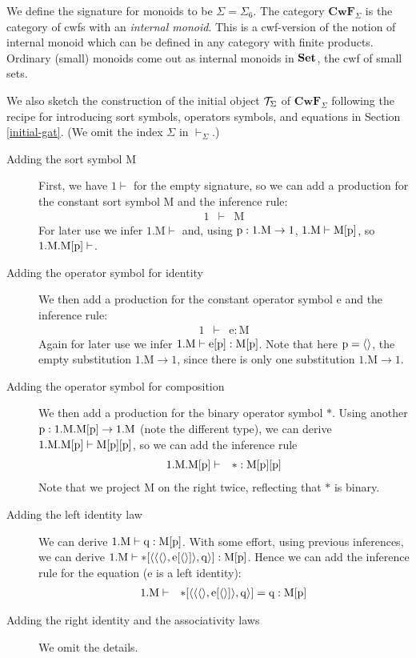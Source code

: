 \documentclass{lmcs}
\def\Cwf{\mathbf{CwF}}
\def\Mon{\mathrm{M}}
\def\idmon{\mathrm{e}}
\def\comp{\mathrm{*}}
\begin{document}
We define the signature for monoids to be $\Sigma = \Sigma_6$. The category $\Cwf_\Sigma$ is the category of cwfs with an {\em internal monoid}. This is a cwf-version of the notion of internal monoid which can be defined in any category with finite products. Ordinary (small) monoids come out as internal monoids in ${\bf Set}$, the cwf of small sets.


We also sketch the construction of the initial object ${\mathcal T}_\Sigma$ of $\Cwf_\Sigma$ following the recipe for introducing sort symbols, operators symbols, and equations in Section \ref{initial-gat}. (We omit the index $\Sigma$ in $\vdash_\Sigma$.)
\begin{description}
\item[Adding the sort symbol $\Mon$]
First, we have $1 \vdash$ for the empty signature, so we can
add a production for the constant sort symbol $\Mon$ and the inference rule:
\begin{eqnarray*}
1 &\vdash& \Mon
\end{eqnarray*}
For later use we infer $1.\Mon \vdash$ and, using $\p:1.\Mon \to 1$, $1.\Mon\vdash\Mon[\p]$,
so $1.\Mon.\Mon[\p] \vdash$.
\item[Adding the operator symbol for identity]
We then add a production for the constant operator symbol $\idmon$ and the inference rule:
\begin{eqnarray*}
1 &\vdash& \idmon : \Mon
\end{eqnarray*}
Again for later use we infer $1.\Mon\vdash \idmon[\p] :\Mon[\p]$.
Note that here $\mathrm{p} = \langle  \rangle$, the empty substitution $1.\Mon \to 1$,
since there is only one substitution $1.\Mon \to 1$.
\item[Adding the operator symbol for composition]
We then add a production for the binary operator symbol $\comp$.
Using another $\p: 1.\Mon.\Mon[\p] \to 1.\Mon$ (note the different type),
we can derive $1.\Mon.\Mon[\p] \vdash \Mon[\p][\p]$, so we can add the inference rule
\begin{eqnarray*}
1.\Mon.\Mon[\p] &\vdash& \comp : \Mon[\p][\p]
\end{eqnarray*}
Note that we project $\Mon$ on the right twice, reflecting that $\comp$ is binary.
\item[Adding the left identity law]
We can derive $1.\Mon \vdash \q : \Mon[\p]$. With some effort,
using previous inferences, we can  derive
$1.\Mon \vdash \comp[\tuple{\tuple{\tuple{},\idmon[\tuple{}]},\q}] : \Mon[\p]$.
Hence we can add the inference rule for the equation ($\idmon$ is a left identity):
\begin{eqnarray*}
1.\Mon &\vdash& \comp[\tuple{\tuple{\tuple{},\idmon[\tuple{}]},\q}] = \q : \Mon[\p]
\end{eqnarray*}
\item[Adding the right identity and the associativity laws]
We omit the details.
\end{description}
\end{document}
